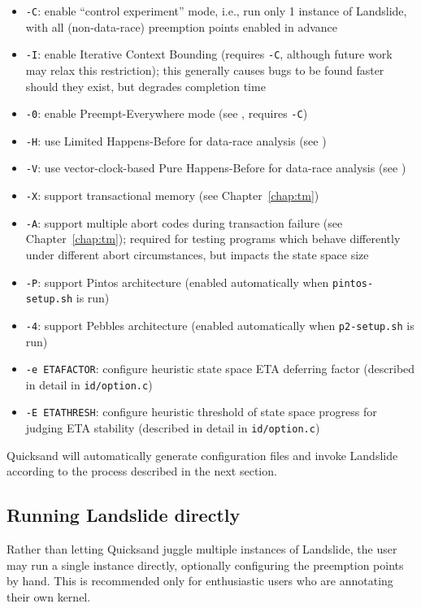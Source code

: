 \begin{itemize}
	\item {\tt -C}: enable ``control experiment'' mode, i.e., run only 1 instance of Landslide, with all (non-data-race) preemption points enabled in advance
	\item {\tt -I}: enable Iterative Context Bounding (requires {\tt -C}, although future work may relax this restriction);
		this generally causes bugs to be found faster should they exist, but degrades completion time
	\item {\tt -0}: enable Preempt-Everywhere mode (see \sect{\ref{sec:quicksand-eval}}, requires {\tt -C})
	\item {\tt -H}: use Limited Happens-Before for data-race analysis (see \sect{\ref{sec:background-hb}})
	\item {\tt -V}: use vector-clock-based Pure Happens-Before for data-race analysis (see \sect{\ref{sec:background-hb}})
	\item {\tt -X}: support transactional memory (see Chapter~\ref{chap:tm})
	\item {\tt -A}: support multiple abort codes during transaction failure (see Chapter~\ref{chap:tm});
		required for testing programs which behave differently under different abort circumstances,
		but impacts the state space size
	\item {\tt -P}: support Pintos architecture (enabled automatically when {\tt pintos-setup.sh} is run)
	\item {\tt -4}: support Pebbles architecture (enabled automatically when {\tt p2-setup.sh} is run)
	\item {\tt -e ETAFACTOR}: configure heuristic state space ETA deferring factor (described in detail in {\tt id/option.c})
	\item {\tt -E ETATHRESH}: configure heuristic threshold of state space progress for judging ETA stability (described in detail in {\tt id/option.c})
\end{itemize}

Quicksand will automatically generate configuration files and invoke Landslide according to the process described in the next section.

\subsection{Running Landslide directly}

Rather than letting Quicksand juggle multiple instances of Landslide,
the user may run a single instance directly, optionally configuring the preemption points by hand.
This is recommended only for enthusiastic users who are annotating their own kernel.

